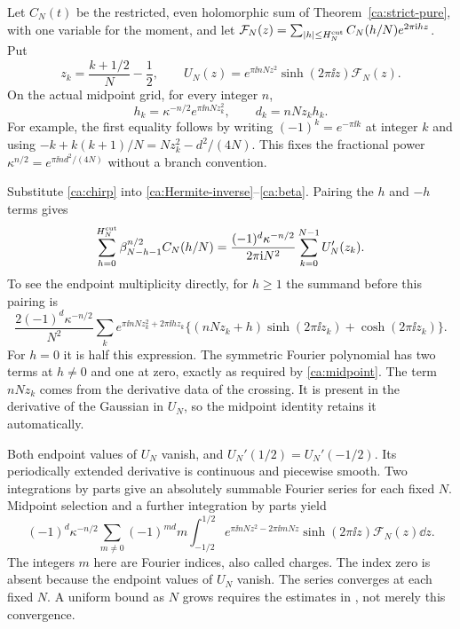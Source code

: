 Let $C_N(t)$ be the restricted, even holomorphic sum of
Theorem~\ref{ca:strict-pure}, with one variable for the moment, and let
$\mathcal F_N(z)=\sum_{|h|\le H_N^{\rm cut}}C_N(h/N)e^{2\pi\mathrm i hz}$.
Put
\[
 z_k=\frac{k+1/2}{N}-\frac12,\qquad
 U_N(z)=e^{\pi\ii nNz^2}\sinh(2\pi\ii z)\mathcal F_N(z).
\]
On the actual midpoint grid, for every integer $n$,
\begin{equation}\label{ca:chirp}
 h_k=\kappa^{-n/2}e^{\pi\ii nNz_k^2},\qquad
 d_k=nNz_kh_k.
\end{equation}
For example, the first equality follows by writing
$(-1)^k=e^{-\pi\ii k}$ at integer $k$ and using
$-k+k(k+1)/N=Nz_k^2-d^2/(4N)$. This fixes the fractional power
$\kappa^{n/2}=e^{\pi\ii n d^2/(4N)}$ without a branch convention.

Substitute \eqref{ca:chirp} into \eqref{ca:Hermite-inverse}--\eqref{ca:beta}. Pairing the $h$ and $-h$ terms gives
\begin{equation}\label{ca:midpoint}
 \sum_{h=0}^{H_N^{\rm cut}}\beta_{N-h-1}^{n/2}C_N(h/N)
 =\frac{(-1)^d\kappa^{-n/2}}{2\pi\mathrm i N^2}
      \sum_{k=0}^{N-1}U_N'(z_k).
\end{equation}
To see the endpoint multiplicity directly, for $h\ge1$ the summand before this pairing is
\[
 \frac{2(-1)^d\kappa^{-n/2}}{N^2}
 \sum_k e^{\pi\ii nNz_k^2+2\pi\ii h z_k}
 \{(nNz_k+h)\sinh(2\pi\ii z_k)+\cosh(2\pi\ii z_k)\}.
\]
For $h=0$ it is half this expression. The symmetric Fourier polynomial has two terms at $h\ne0$ and one at zero, exactly as required by \eqref{ca:midpoint}. The term $nNz_k$ comes from the derivative data of the crossing.
It is present in the derivative of the Gaussian in $U_N$, so the
midpoint identity retains it automatically.

Both endpoint values of $U_N$ vanish, and
$U_N'(1/2)=U_N'(-1/2)$. Its periodically extended derivative is continuous and piecewise smooth. Two integrations by parts give an absolutely summable Fourier series for each fixed $N$. Midpoint selection and a further integration by parts yield
\begin{equation}\label{ca:charge-one}
 (-1)^d\kappa^{-n/2}
 \sum_{m\ne0}(-1)^{md}m
 \int_{-1/2}^{1/2}
 e^{\pi\ii nNz^2-2\pi\ii mNz}
 \sinh(2\pi\ii z)\mathcal F_N(z)\dd z.
\end{equation}
The integers $m$ here are Fourier indices, also called charges.
The index zero is absent because the endpoint values of $U_N$ vanish.
The series converges at each fixed $N$. A uniform bound as $N$ grows
requires the estimates in \cite{Filling}, not merely this convergence.

